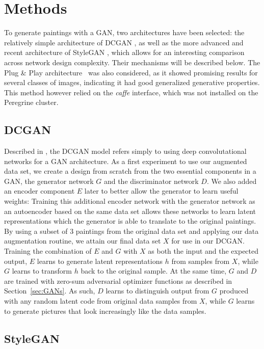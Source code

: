 \documentclass{article}
\begin{document}
\section{Methods}
To generate paintings with a GAN, two architectures have been selected: the relatively simple architecture of DCGAN \cite{radford2015unsupervised}, as well as the more advanced and recent architecture of StyleGAN \cite{karras2019stylebased}, which allows for an interesting comparison across network design complexity. Their mechanisms will be described below. The Plug \& Play architecture~\cite{nguyen2017plug} was also considered, as it showed promising results for several classes of images, indicating it had good generalized generative properties. This method however relied on the \textit{caffe} interface, which was not installed on the Peregrine cluster.

\subsection{DCGAN} \label{sec:dcgan}
Described in \cite{radford2015unsupervised}, the DCGAN model refers simply to using deep convolutational networks for a GAN architecture. As a first experiment to use our augmented data set, we create a design from scratch from the two essential components in a GAN, the generator network $G$ and the discriminator network $D$. We also added an encoder component $E$ later to better allow the generator to learn useful weights: Training this additional encoder network with the generator network as an autoencoder based on the same data set allows these networks to learn latent representations which the generator is able to translate to the original paintings. By using a subset of 3 paintings from the original data set and applying our data augmentation routine, we attain our final data set $X$ for use in our DCGAN. Training the combination of $E$ and $G$ with $X$ as both the input and the expected output, $E$ learns to generate latent representations $h$ from samples from $X$, while $G$ learns to transform $h$ back to the original sample. At the same time, $G$ and $D$ are trained with zero-sum adversarial optimizer functions as described in Section~\ref{sec:GANs}. As such, $D$ learns to distinguish output from $G$ produced with any random latent code from original data samples from $X$, while $G$ learns to generate pictures that look increasingly like the data samples.

\subsection{StyleGAN}
\end{document}
